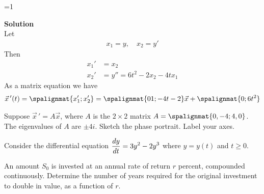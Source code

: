 \documentclass[12pt]{exam}
\newcommand{\sol}{1} %
\begin{document}
\begin{questions}
    \ifnum \sol=1
    {\color{DarkBlue} \textbf{Solution}\\ Let 
    \begin{align*}
        x_1 = y , \quad 
        x_2 = y' 
    \end{align*}
    Then 
    \begin{align*}
        x_1' &= x_2 \\
        x_2' &= y'' = 6t^2 - 2x_2 - 4tx_1
    \end{align*}
    As a matrix equation we have
    \begin{align*}
        \vec x \, ' (t) = \spalignmat{x_1';x_2'} = \spalignmat{0 1;-4t -2}\vec x + \spalignmat{0;6t^2}
    \end{align*}
    
    
    }
    \fi
    

    \question[3] %
    Suppose $\vec x \, ' = A \vec x$, where $A$ is the $2\times 2$ matrix
    $A = \spalignmat{0,-4;4,0}$.
    The eigenvalues of $A$ are $\pm 4i$. Sketch the phase portrait. Label your axes.
    
    
    \newpage\Initials
    \question[10] Consider the differential equation $\displaystyle {\frac{dy}{dt}} = 3y^2 - 2y^3$ where $y=y(t)$ and $t\ge0$.
    
    
 	\newpage\Initials    
    
    
    \question[3] An amount $S_0$ is invested at an annual rate of return $r$ percent, compounded continuously. Determine the number of years required for the original investment to double in value, as a function of $r$. 
    

\end{questions}
\end{document}
